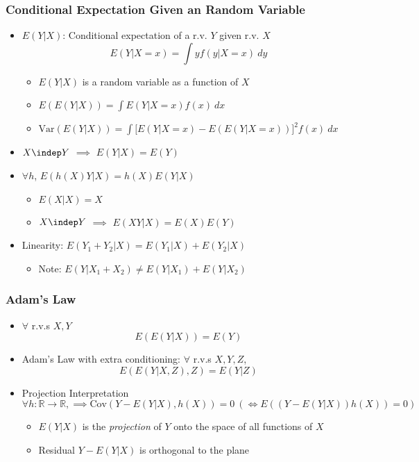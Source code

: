 \subsubsection*{Conditional Expectation Given an Random Variable}
\begin{itemize}
    \item $E(Y|X)$: Conditional expectation of a r.v. $Y$ given r.v. $X$
    \begin{equation}
        E(Y|X=x)=\int yf(y|X=x)~dy
    \end{equation}
    \begin{itemize}
        \item $E(Y|X)$ is a random variable as a function of $X$
        \item $E(E(Y|X))=\int E(Y|X=x)f(x)~dx$
        \item $\text{Var}(E(Y|X))=\int \Bigr[E(Y|X=x)-E(E(Y|X=x))\Bigr]^2f(x)~dx$
    \end{itemize}
    \item $X\indep Y$ $\implies$ $E(Y|X)=E(Y)$
    \item $\forall h$, $E(h(X)Y|X)=h(X)E(Y|X)$
    \begin{itemize}
        \item $E(X|X)=X$
        \item $X\indep Y$ $\implies$ $E(XY|X)=E(X)E(Y)$
    \end{itemize}
    \item Linearity: $E(Y_1+Y_2|X)=E(Y_1|X)+E(Y_2|X)$
    \begin{itemize}
        \item Note: $E(Y|X_1+X_2)\neq E(Y|X_1)+E(Y|X_2)$
    \end{itemize}
\end{itemize}

\subsubsection*{Adam's Law}
\begin{itemize}
    \item $\forall$ r.v.s $X,Y$
    \begin{equation}
        E(E(Y|X))=E(Y)
    \end{equation}
    \item Adam's Law with extra conditioning: $\forall$ r.v.s $X,Y,Z$,
    \begin{equation}
        E(E(Y|X,Z),Z)=E(Y|Z)
    \end{equation}
    \item Projection Interpretation
    \begin{equation}
        \forall h:\mathbb{R}\to\mathbb{R},\implies\text{Cov}(Y-E(Y|X),h(X))=0~(\iff E((Y-E(Y|X))h(X))=0)
    \end{equation}
    \begin{itemize}
        \item $E(Y|X)$ is the \textit{projection} of $Y$ onto the space of all functions of $X$
        \item Residual $Y-E(Y|X)$ is orthogonal to the plane
    \end{itemize}
\end{itemize}

